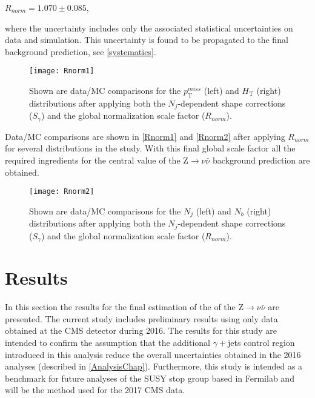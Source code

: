 \begingroup
	\begin{center}
		$R_{norm} = 1.070 \pm 0.085$,
	\end{center}
\endgroup

\noindent where the uncertainty includes only the associated statistical uncertainties on data and simulation. This uncertainty is found to be propagated to the final background prediction, see \autoref{systematics}.\\

\begin{figure}[H]
\begin{center}
\texttt{[image: Rnorm1]}
\end{center}
\vspace{-1em}
\caption{Shown are data/MC comparisons for the $p_\text{T}^{miss}$ (left) and $H_\text{T}$ (right) distributions after applying both the $N_j$-dependent shape corrections ($S_\gamma$) and the global normalization scale factor ($R_{norm}$).}
\label{Rnorm1}
\end{figure}

Data/MC comparisons are shown in \autoref{Rnorm1} and \autoref{Rnorm2} after applying $R_{norm}$ for several distributions in the study. With this final global scale factor all the required ingredients for the central value of the Z$\rightarrow\nu\bar{\nu}$ background prediction are obtained. 

\begin{figure}[H]
\begin{center}
\texttt{[image: Rnorm2]}
\end{center}
\vspace{-1em}
\caption{Shown are data/MC comparisons for the $N_j$ (left) and $N_b$ (right) distributions after applying both the $N_j$-dependent shape corrections ($S_\gamma$) and the global normalization scale factor ($R_{norm}$).}
\label{Rnorm2}
\end{figure}

\section{Results}

In this section the results for the final estimation of the of the Z$\rightarrow\nu\bar{\nu}$ are presented. The current study includes preliminary results using only data obtained at the CMS detector during 2016. The results for this study are intended to confirm the assumption that the additional $\gamma+$jets control region introduced in this analysis reduce the overall uncertainties obtained in the 2016 analyses (described in \autoref{AnalysisChap}). Furthermore, this study is intended as a benchmark for future analyses of the SUSY stop group based in Fermilab and will be the method used for the 2017 CMS data.

